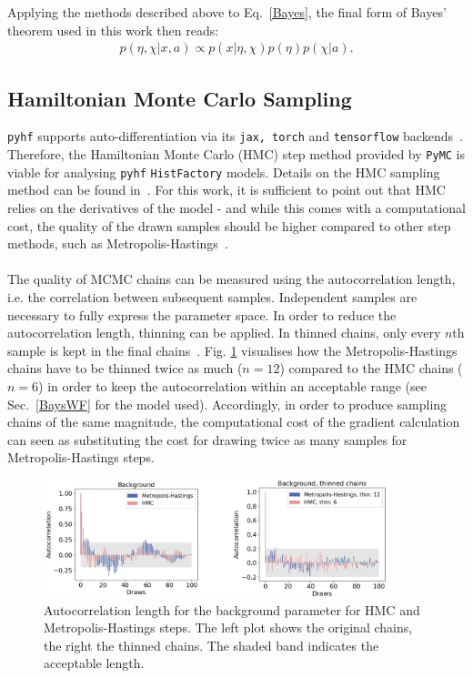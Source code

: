 \noindent Applying the methods described above to Eq.~\eqref{Bayes}, the final form of Bayes' theorem used in this work then reads:
    \begin{align} \label{BayesConj_final}
        p(\eta, \chi \vert x, a) \propto p(x\vert \eta, \chi) p(\eta) p(\chi | a).
    \end{align}


\subsection{Hamiltonian Monte Carlo Sampling}
\texttt{pyhf} supports auto-differentiation via its \texttt{jax, torch} and \texttt{tensorflow} backends~\cite{pyhf, pyhf_joss, jax2018github, tensorflow2015-whitepaper, paszke2017automatic}. Therefore, the Hamiltonian Monte Carlo (HMC) step method provided by \texttt{PyMC} is viable for analysing \texttt{pyhf} \texttt{HistFactory} models. Details on the HMC sampling method can be found in~\cite{vishnoi2021introduction}. For this work, it is sufficient to point out that HMC relies on the derivatives of the model - and while this comes with a computational cost, the quality of the drawn samples should be higher compared to other step methods, such as Metropolis-Hastings~\cite{Metropolis1953}. \\ \\
\noindent The quality of MCMC chains can be measured using the autocorrelation length, i.e. the correlation between subsequent samples. Independent samples are necessary to fully express the parameter space. In order to reduce the autocorrelation length, thinning can be applied. In thinned chains, only every $n$th sample is kept in the final chains~\cite{hoyer2017xarray}. Fig. \ref{autocorr} visualises how the Metropolis-Hastings chains have to be thinned twice as much ($n=12$) compared to the HMC chains ($n=6$) in order to keep the autocorrelation within an acceptable range (see Sec.~\ref{BaysWF} for the model used). Accordingly, in order to produce sampling chains of the same magnitude, the computational cost of the gradient calculation can seen as substituting the cost for drawing twice as many samples for Metropolis-Hastings steps.
    \begin{figure}%
        \centering
        \includegraphics[width=10cm]{figures/autocorr.png}
        \centering
        \caption{Autocorrelation length for the background parameter for HMC and Metropolis-Hastings steps. The left plot shows the original chains, the right the thinned chains. The shaded band indicates the acceptable length.}
        \label{autocorr}
    \end{figure}
